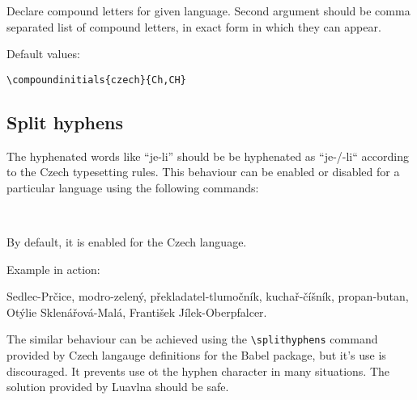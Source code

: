 \documentclass[12pt]{ltxdoc}
\newenvironment{mycode}{
	\medskip%
	\parindent=0pt%
}{\medskip}
\begin{document}

\begin{mycode}
\cmd{\compoundinitials}
\end{mycode}

Declare compound letters for given language. Second argument should be comma 
separated list of compound letters, in exact form in which they can appear.

Default values:

\begin{mycode}
\begin{verbatim}
\compoundinitials{czech}{Ch,CH}
\end{verbatim}
\end{mycode}


\subsection{Split hyphens}

The hyphenated words like ``je-li'' should be be hyphenated as ``je-/-li``
according to the Czech typesetting rules. This behaviour can be enabled or disabled for a particular
language using the following commands:

\begin{mycode}
  \cmd{\enablesplithyphens}\\
  \cmd{\disablesplithyphens}
\end{mycode}

By default, it is enabled for the Czech language.

Example in action:

\begin{minipage}{3in}
   Sedlec-Prčice, modro-zelený,  překladatel-tlumočník, kuchař-číšník, propan-butan,                                                                                          
   Otýlie Sklenářová-Malá, František Jílek-Oberpfalcer.
\end{minipage}

The similar behaviour can be achieved using the \verb|\splithyphens|  command
provided by Czech langauge definitions for the Babel package, but it's use is
discouraged. It prevents use ot the hyphen character in many situations. The
solution provided by Luavlna should be safe.
\end{document}
